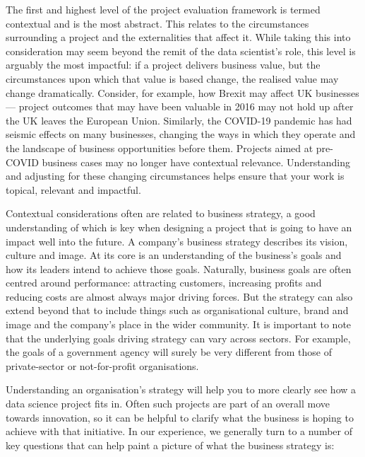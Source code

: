 \documentclass[
]{book}
\begin{document}
The first and highest level of the project evaluation framework is
termed contextual and is the most abstract. This relates to the
circumstances surrounding a project and the externalities that affect
it. While taking this into consideration may seem beyond the remit of
the data scientist's role, this level is arguably the most impactful: if
a project delivers business value, but the circumstances upon which that
value is based change, the realised value may change dramatically.
Consider, for example, how Brexit may affect UK businesses --- project
outcomes that may have been valuable in 2016 may not hold up after the
UK leaves the European Union. Similarly, the COVID-19 pandemic has had
seismic effects on many businesses, changing the ways in which they
operate and the landscape of business opportunities before them.
Projects aimed at pre-COVID business cases may no longer have contextual
relevance. Understanding and adjusting for these changing circumstances
helps ensure that your work is topical, relevant and impactful.

Contextual considerations often are related to business strategy, a good
understanding of which is key when designing a project that is going to
have an impact well into the future. A company's business strategy
describes its vision, culture and image. At its core is an understanding
of the business's goals and how its leaders intend to achieve those
goals. Naturally, business goals are often centred around performance:
attracting customers, increasing profits and reducing costs are almost
always major driving forces. But the strategy can also extend beyond
that to include things such as organisational culture, brand and image
and the company's place in the wider community. It is important to note
that the underlying goals driving strategy can vary across sectors. For
example, the goals of a government agency will surely be very different
from those of private-sector or not-for-profit organisations.

Understanding an organisation's strategy will help you to more clearly
see how a data science project fits in. Often such projects are part of
an overall move towards innovation, so it can be helpful to clarify what
the business is hoping to achieve with that initiative. In our
experience, we generally turn to a number of key questions that can help
paint a picture of what the business strategy is:
\end{document}
